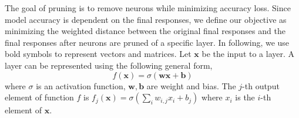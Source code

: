 \documentclass[10pt,twocolumn,letterpaper]{article}
\def\mb{\mathbf}
\begin{document}
The goal of pruning is to remove neurons while minimizing accuracy loss. Since model accuracy is dependent on the final responses,
we define our objective as minimizing the weighted distance between the original final responses and the final responses after neurons are pruned of a specific layer.  In following, we use bold symbols to represent vectors and matrices.
Let $\mb x$ be the input to a layer. A layer can be represented using the following general form,
\begin{equation}
\label{proof1_objective_2}
f(\mb x)=\sigma(\mb w\mb x+\mathbf b)
\end{equation}
where $\sigma$ is an activation function, $\mb w,\mb b$ are weight and bias. The $j$-th output element of function $f$ is
$f_j(\mb x) = \sigma\left(\sum_{i} w_{i,j}x_i+b_j\right)$
where $x_i$ is the $i$-th element of $\mb x$.
\fi%
\end{document}
